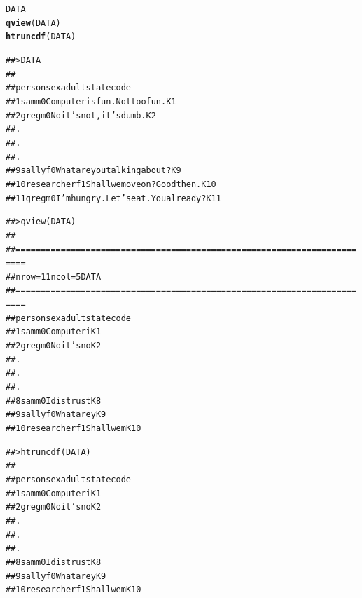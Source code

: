 \documentclass{article}\usepackage[]{graphicx}\usepackage[]{color}
\makeatletter
\newcommand{\hlstd}[1]{\textcolor[rgb]{0.345,0.345,0.345}{#1}}%
\newcommand{\hlkwd}[1]{\textcolor[rgb]{0.737,0.353,0.396}{\textbf{#1}}}%
\newenvironment{kframe}{%
 \def\at@end@of@kframe{}%
 \ifinner\ifhmode%
  \def\at@end@of@kframe{\end{minipage}}%
  \begin{minipage}{\columnwidth}%
 \fi\fi%
 \def\FrameCommand##1{\hskip\@totalleftmargin \hskip-\fboxsep
 \colorbox{shadecolor}{##1}\hskip-\fboxsep
     \hskip-\linewidth \hskip-\@totalleftmargin \hskip\columnwidth}%
 \MakeFramed {\advance\hsize-\width
   \@totalleftmargin\z@ \linewidth\hsize
   \@setminipage}}%
 {\par\unskip\endMakeFramed%
 \at@end@of@kframe}
\newenvironment{knitrout}{}{} %
\makeatother
\begin{document}
\begin{knitrout}
\color{fgcolor}\begin{kframe}
\begin{alltt}
\hlstd{DATA}
\hlkwd{qview}\hlstd{(DATA)}
\hlkwd{htruncdf}\hlstd{(DATA)}
\end{alltt}
\end{kframe}
\end{knitrout}


\begin{knitrout}
\color{fgcolor}\begin{kframe}
\begin{alltt}
## > DATA
##
##        person sex adult                                 state code
## 1         sam   m     0         Computer is fun. Not too fun.   K1
## 2        greg   m     0               No it's not, it's dumb.   K2
## .
## .
## .
## 9       sally   f     0           What are you talking about?   K9
## 10 researcher   f     1         Shall we move on?  Good then.  K10
## 11       greg   m     0 I'm hungry.  Let's eat.  You already?  K11
\end{alltt}
\end{kframe}
\end{knitrout}

\begin{knitrout}
\color{fgcolor}\begin{kframe}
\begin{alltt}
## > qview(DATA)
##
## ========================================================================
## nrow =  11           ncol =  5             DATA
## ========================================================================
##        person sex adult      state code
## 1         sam   m     0 Computer i   K1
## 2        greg   m     0 No it's no   K2
## .
## .
## .
## 8         sam   m     0 I distrust   K8
## 9       sally   f     0 What are y   K9
## 10 researcher   f     1 Shall we m  K10
\end{alltt}
\end{kframe}
\end{knitrout}

\begin{knitrout}
\color{fgcolor}\begin{kframe}
\begin{alltt}
## > htruncdf(DATA)
##
##        person sex adult      state code
## 1         sam   m     0 Computer i   K1
## 2        greg   m     0 No it's no   K2
## .
## .
## .
## 8         sam   m     0 I distrust   K8
## 9       sally   f     0 What are y   K9
## 10 researcher   f     1 Shall we m  K10
\end{alltt}
\end{kframe}
\end{knitrout}
\end{document}
